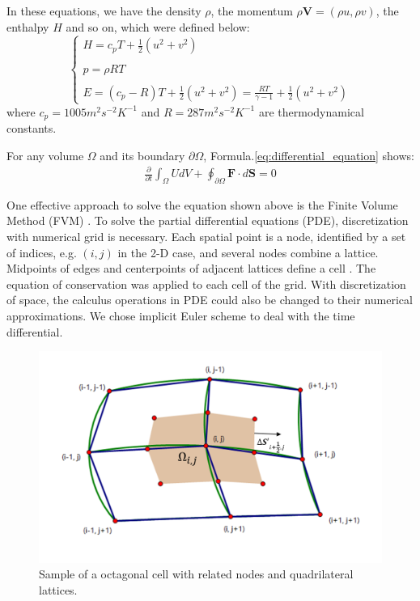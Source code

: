 \documentclass[%
 reprint,
 amsmath,amssymb,
pra,
]{revtex4-1}
\begin{document}
\begin{itemize}
In these equations, we have the density $\rho$, the momentum $\rho\bm{V}=\left(\rho u, \rho v\right)$, the enthalpy $H$ and so on, which were defined below:
\begin{equation}
\left\{
\begin{array}{l}
	H =  c_p T + \frac{1}{2}\left(u^2 + v^2\right)\\
	\\
	p =  \rho R T\\
	\\
	E = \left(c_p - R\right) T + \frac{1}{2}\left(u^2 + v^2\right) = \frac{R T}{\gamma - 1} + \frac{1}{2}\left(u^2 + v^2\right)
\end{array}
\right.
\end{equation}
where $c_p = 1005 m^2 s^{-2} K^{-1}$ and $R = 287 m^2 s^{-2} K^{-1}$ are thermodynamical constants.

For any volume $\Omega$ and its boundary $\partial\Omega$, Formula.\ref{eq:differential_equation} shows:
\begin{align}\label{eq:integral_equation}
	\frac{\partial}{\partial t}\int_\Omega U d V + \oint_{\partial \Omega} \bm{F} \cdot d \bm{S} = 0
\end{align}

One effective approach to solve the equation shown above is the Finite Volume Method (FVM) \cite{eymard2000finite}. To solve the partial differential equations (PDE), discretization with numerical grid is necessary. Each spatial point is a node, identified by a set of indices, e.g. $\left(i, j\right)$ in the 2-D case, and several nodes combine a lattice. Midpoints of edges and centerpoints of adjacent lattices define a cell \cite{economon2015su2}. The equation of conservation was applied to each cell of the grid. With discretization of space, the calculus operations in PDE could also be changed to their numerical approximations. We chose implicit Euler scheme to deal with the time differential.
\begin{figure}[h]
	\centering  
	\includegraphics[width=0.7\linewidth]{Fig/grid}
	\caption{Sample of a octagonal cell with related nodes and quadrilateral lattices.}
	\label{fig:sample_of_cell}
\end{figure}


\end{itemize}
\end{document}
